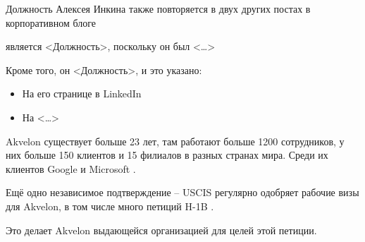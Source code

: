 Должность Алексея Инкина  также повторяется в двух других постах в корпоративном блоге



\MrAkvelon является <Должность>, поскольку он был <\dots>

Кроме того, он <Должность>, и это указано:

\begin{itemize}

    \item На его странице в LinkedIn 

    \item На <\dots> 

\end{itemize}



Akvelon существует больше 23 лет, там работают больше 1200 сотрудников, у них больше 150 клиентов и 15 филиалов в разных странах мира.
Среди их клиентов Google и Microsoft .

Ещё одно независимое подтверждение -- USCIS регулярно одобряет рабочие визы для Akvelon,
в том числе много петиций H-1B .

Это делает Akvelon выдающейся организацией для целей этой петиции.
